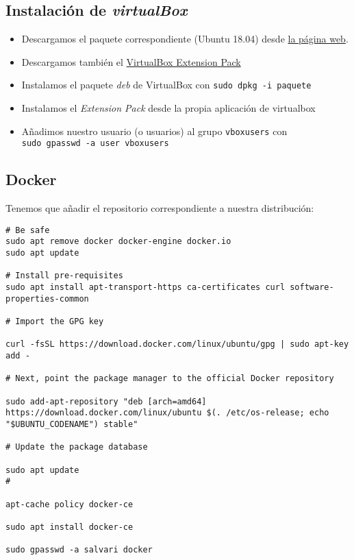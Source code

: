 \documentclass[
  12pt,
  spanish,
]{article}
\providecommand{\tightlist}{%
  \setlength{\itemsep}{0pt}\setlength{\parskip}{0pt}}
\begin{document}
\hypertarget{instalaciuxf3n-de-virtualbox}{%
\subsection{\texorpdfstring{Instalación de
\emph{virtualBox}}{Instalación de virtualBox}}\label{instalaciuxf3n-de-virtualbox}}

\begin{itemize}
\tightlist
\item
  Descargamos el paquete correspondiente (Ubuntu 18.04) desde
  \href{https://www.virtualbox.org/wiki/Linux_Downloads}{la página web}.
\item
  Descargamos también el
  \href{https://www.virtualbox.org/wiki/Downloads}{VirtualBox Extension
  Pack}
\item
  Instalamos el paquete \emph{deb} de VirtualBox con
  \texttt{sudo\ dpkg\ -i\ paquete}
\item
  Instalamos el \emph{Extension Pack} desde la propia aplicación de
  virtualbox
\item
  Añadimos nuestro usuario (o usuarios) al grupo \texttt{vboxusers} con
  \texttt{sudo\ gpasswd\ -a\ user\ vboxusers}
\end{itemize}

\hypertarget{docker}{%
\subsection{Docker}\label{docker}}

Tenemos que añadir el repositorio correspondiente a nuestra
distribución:

\begin{verbatim}
# Be safe
sudo apt remove docker docker-engine docker.io
sudo apt update

# Install pre-requisites
sudo apt install apt-transport-https ca-certificates curl software-properties-common

# Import the GPG key

curl -fsSL https://download.docker.com/linux/ubuntu/gpg | sudo apt-key add -

# Next, point the package manager to the official Docker repository

sudo add-apt-repository "deb [arch=amd64] https://download.docker.com/linux/ubuntu $(. /etc/os-release; echo "$UBUNTU_CODENAME") stable"

# Update the package database

sudo apt update
#

apt-cache policy docker-ce

sudo apt install docker-ce

sudo gpasswd -a salvari docker
\end{verbatim}
\end{document}
